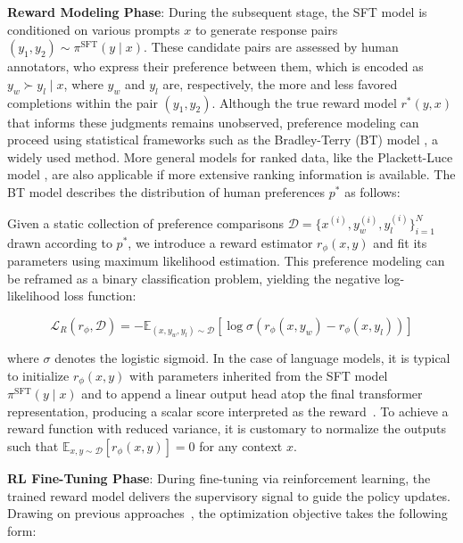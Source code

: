 \textbf{Reward Modeling Phase}: During the subsequent stage, the SFT model is conditioned on various prompts $x$ to generate response pairs $(y_1, y_2)\sim \pi^\text{SFT}(y \mid x)$. These candidate pairs are assessed by human annotators, who express their preference between them, which is encoded as $y_w\succ y_l \mid x$, where $y_w$ and $y_l$ are, respectively, the more and less favored completions within the pair $(y_1, y_2)$. Although the true reward model $r^*(y, x)$ that informs these judgments remains unobserved, preference modeling can proceed using statistical frameworks such as the Bradley-Terry (BT) model \cite{bradley1952rankanalysis}, a widely used method. More general models for ranked data, like the Plackett-Luce model \citep{plackett1975analysis, luce2012individual}, are also applicable if more extensive ranking information is available. The BT model describes the distribution of human preferences $p^*$ as follows:

Given a static collection of preference comparisons $\mathcal{D}=\bigl\{x^{(i)}, y_w^{(i)}, y_l^{(i)}\bigr\}_{i=1}^N$ drawn according to $p^*$, we introduce a reward estimator $r_{\phi}(x, y)$ and fit its parameters using maximum likelihood estimation. This preference modeling can be reframed as a binary classification problem, yielding the negative log-likelihood loss function:

\begin{equation}\label{eq:reward_model}
    \mathcal{L}_R(r_{\phi}, \mathcal{D}) = -\mathbb{E}_{(x, y_w, y_l)\sim \mathcal{D}}\left[\log \sigma(r_{\phi}(x, y_w)- r_{\phi}(x, y_l))\right]
\end{equation}

where $\sigma$ denotes the logistic sigmoid. In the case of language models, it is typical to initialize $r_{\phi}(x, y)$ with parameters inherited from the SFT model $\pi^\text{SFT}(y \mid x)$ and to append a linear output head atop the final transformer representation, producing a scalar score interpreted as the reward~\cite{ziegler2020finetuning}. To achieve a reward function with reduced variance, it is customary to normalize the outputs such that $\mathbb{E}_{x,y\sim \mathcal{D}}[r_\phi(x, y)] = 0$ for any context $x$.

\textbf{RL Fine-Tuning Phase}: During fine-tuning via reinforcement learning, the trained reward model delivers the supervisory signal to guide the policy updates. Drawing on previous approaches~\citep{jaques2017sequence, jaques2020human}, the optimization objective takes the following form:

